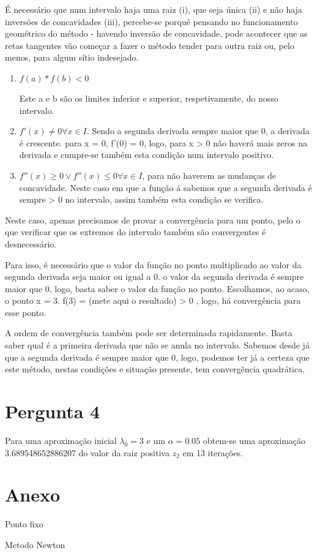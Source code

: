 \documentclass[a4paper, 18pt]{article}
\begin{document}
	\par
	É necessário que num intervalo haja uma raiz (i), que seja única (ii) e não haja inversões de concavidades (iii),
	percebe-se porquê pensando no funcionamento geométrico do método - havendo inversão de concavidade, pode
	acontecer que as retas tangentes vão começar a fazer o método tender para outra raiz ou, pelo menos, para
	algum sítio indesejado.

	\begin{enumerate}[i]
	\item $f(a)*f(b) < 0$
	\par
	Este a e b são os limites inferior e superior, respetivamente, do nosso intervalo.

	\item $f'(x) \neq 0 \! \forall \! x \in I$. Sendo a segunda derivada sempre maior que 0, a derivada é crescente.
	para x = 0, f'(0) = 0, logo, para x > 0 não haverá mais zeros na derivada e cumpre-se também esta condição num intervalo positivo.

	\item $f''(x) \geqslant 0 \vee f''(x) \leqslant 0 \! \forall \! x \in I$, para não haverem as mudanças de concavidade.
	Neste caso em que a função á sabemos que a segunda derivada é sempre > 0 no intervalo, assim também esta condição se verifica.
	\end{enumerate}
	
	Neste caso, apenas precisamos de provar a convergência para um ponto, pelo o que verificar que os extremos do intervalo também são convergentes é desnecessário.

	Para isso, é
	necessário que o valor da função no ponto multiplicado ao valor da segunda derivada seja maior ou igual a 0.
	o valor da segunda derivada é sempre maior que 0, logo, basta saber o valor da função no ponto. Escolhamos, 
	ao acaso, o ponto x = 3. f(3) = (mete aqui o resultado) > 0 , logo, há convergência para esse ponto.

	A ordem de convergência também pode ser determinada rapidamente. Basta saber qual é a primeira derivada que não 
	se anula no intervalo. Sabemos desde já que a segunda derivada é sempre maior que 0, logo, podemos ter já a 
	certeza que este método, nestas condições e situação presente, tem convergência quadrática.

\section{Pergunta 4}
\par Para uma aproximação inicial $\lambda _0 = 3$ e um $\alpha = 0.05$ obtem-se uma aproximação 3.689548652886207 do valor da raiz positiva $z_2$ em 13 iterações.

\section{Anexo}

\par{Ponto fixo}
	

\par{Metodo Newton}
	
\end{document}
